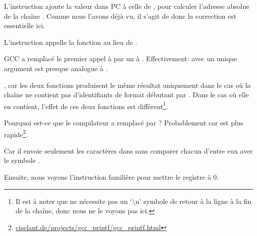 L'instruction  ajoute la valeur dans \ac{PC} à celle de
, pour calculer l'adresse absolue de la chaîne .
Comme nous l'avons déjà vu, il s'agit de \q{\PICcode} donc la correction
est essentielle ici.

L'instruction  appelle la fonction \puts au lieu de \printf.

\label{puts}

GCC a remplacé le premier appel à \printf par un à \puts.
Effectivement: \printf avec un unique argument est presque analogue à \puts.

, car les deux fonctions produisent le même résultat uniquement dans
le cas où la chaîne ne contient pas d'identifiants de format débutant par \IT{\%}.
Dans le cas où elle en contient, l'effet de ces deux fonctions est différent\footnote{Il
est à noter que \puts ne nécessite pas un `\textbackslash{}n'
symbole de retour à la ligne à la fin de la chaîne, donc nous ne le voyons pas ici.}.

Pourquoi est-ce que le compilateur a remplacé \printf par \puts? Probablement car
\puts est plus
rapide\footnote{\href{http://go.yurichev.com/17063}{ciselant.de/projects/gcc\_printf/gcc\_printf.html}}. 

Car il envoie seulement les caractères dans 
sans comparer chacun d'entre eux avec le symbole \IT{\%}.

Ensuite, nous voyons l'instruction familière  pour mettre le
registre  à 0.
